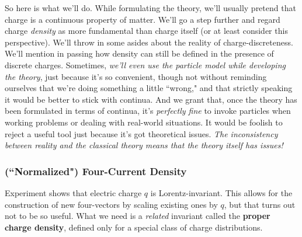 \documentclass[12pt]{article}
\begin{document}
So here is what we'll do. While formulating the theory, we'll usually pretend that charge is a continuous property of matter. We'll go a step further and regard charge \emph{density} as more fundamental than charge itself (or at least consider this perspective). We'll throw in some asides about the reality of charge-discreteness. We'll mention in passing how density can still be defined in the presence of discrete charges. Sometimes, \emph{we'll even use the particle model while developing the theory}, just because it's so convenient, though not without reminding ourselves that we're doing something a little ``wrong," and that strictly speaking it would be better to stick with continua. And we grant that, once the theory has been formulated in terms of continua, it's \emph{perfectly fine} to invoke particles when working problems or dealing with real-world situations. It would be foolish to reject a useful tool just because it's got theoretical issues. \emph{The inconsistency between reality and the classical theory means that the theory itself has issues!}

\subsubsection[(“Normalized”) Four-Current Density]{(``Normalized") Four-Current Density}\label{sssec:fcd}

Experiment shows that electric charge $q$ is Lorentz-invariant. This allows for the construction of new four-vectors by scaling existing ones by $q$, but that turns out not to be so useful. What we need is a \emph{related} invariant called the \textbf{proper charge density}, defined only for a special class of charge distributions.
\end{document}
